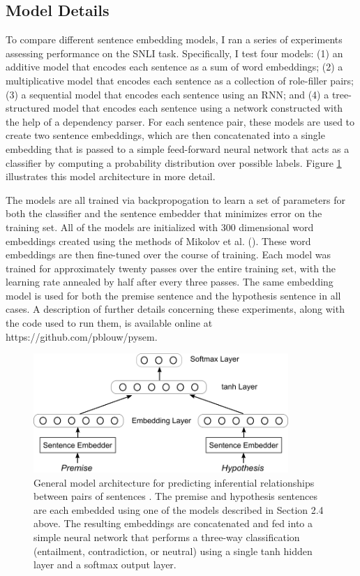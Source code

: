 \subsection{Model Details}

To compare different sentence embedding models, I ran a series of experiments assessing performance on the SNLI task. Specifically, I test four models: (1) an additive model that encodes each sentence as a sum of word embeddings; (2) a multiplicative model that encodes each sentence as a collection of role-filler pairs; (3) a sequential model that encodes each sentence using an RNN; and (4) a tree-structured model that encodes each sentence using a network constructed with the help of a dependency parser. For each sentence pair, these models are used to create two sentence embeddings, which are then concatenated into a single embedding that is passed to a simple feed-forward neural network that acts as a classifier by computing a probability distribution over possible labels. Figure \ref{fig:model} illustrates this model architecture in more detail.

The models are all trained via backpropogation to learn a set of parameters for both the classifier and the sentence embedder that minimizes error on the training set. All of the models are initialized with 300 dimensional word embeddings created using the methods of Mikolov et al. (\citeyear{Mikolov:2013}). These word embeddings are then fine-tuned over the course of training. Each model was trained for approximately twenty passes over the entire training set, with the learning rate annealed by half after every three passes. The same embedding model is used for both the premise sentence and the hypothesis sentence in all cases. A description of further details concerning these experiments, along with the code used to run them, is available online at https://github.com/pblouw/pysem. 

\begin{figure}
\centering
	\includegraphics[width=3.8in]{figures/classifier.png}
	\caption{General model architecture for predicting inferential relationships between pairs of sentences \citep[see][]{Bowman:2015}. The premise and hypothesis sentences are each embedded using one of the models described in Section 2.4 above. The resulting embeddings are concatenated and fed into a simple neural network that performs a three-way classification (entailment, contradiction, or neutral) using a single tanh hidden layer and a softmax output layer.}\label{fig:model}
\end{figure}

